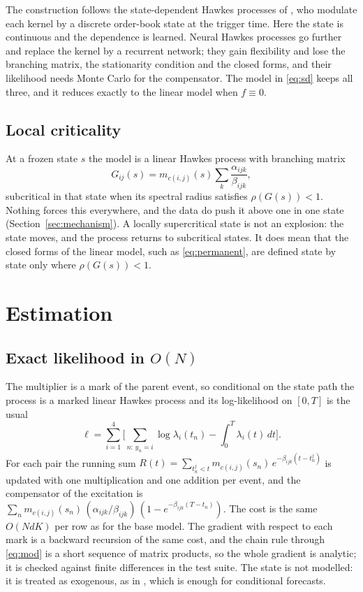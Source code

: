\documentclass[a4paper,11pt]{article}
\begin{document}
The construction follows the state-dependent Hawkes processes of \cite{morariupatrichi2022}, who modulate each kernel by a discrete order-book state at the trigger time. Here the state is continuous and the dependence is learned. Neural Hawkes processes \cite{du2016,mei2017} go further and replace the kernel by a recurrent network; they gain flexibility and lose the branching matrix, the stationarity condition and the closed forms, and their likelihood needs Monte Carlo for the compensator. The model in \eqref{eq:sd} keeps all three, and it reduces exactly to the linear model when $f \equiv 0$.

\subsection{Local criticality}

At a frozen state $s$ the model is a linear Hawkes process with branching matrix
\begin{equation}
G_{ij}(s) = m_{c(i,j)}(s) \sum_k \frac{\alpha_{ijk}}{\beta_{ijk}},
\end{equation}
subcritical in that state when its spectral radius satisfies $\rho(G(s)) < 1$. Nothing forces this everywhere, and the data do push it above one in one state (Section~\ref{sec:mechanism}). A locally supercritical state is not an explosion: the state moves, and the process returns to subcritical states. It does mean that the closed forms of the linear model, such as \eqref{eq:permanent}, are defined state by state only where $\rho(G(s)) < 1$.

\section{Estimation}

\subsection{Exact likelihood in $O(N)$}

The multiplier is a mark of the parent event, so conditional on the state path the process is a marked linear Hawkes process and its log-likelihood on $[0,T]$ is the usual
\begin{equation}
\ell = \sum_{i=1}^{4} \Big[ \sum_{n:\, y_n = i} \log \lambda_i(t_n) - \int_0^T \lambda_i(t)\,dt \Big].
\end{equation}
For each pair the running sum $R(t) = \sum_{t^j_n < t} m_{c(i,j)}(s_n)\, e^{-\beta_{ijk}(t - t^j_n)}$ is updated with one multiplication and one addition per event, and the compensator of the excitation is $\sum_n m_{c(i,j)}(s_n)\,(\alpha_{ijk}/\beta_{ijk})\,(1 - e^{-\beta_{ijk}(T - t_n)})$. The cost is the same $O(NdK)$ per row as for the base model. The gradient with respect to each mark is a backward recursion of the same cost, and the chain rule through \eqref{eq:mod} is a short sequence of matrix products, so the whole gradient is analytic; it is checked against finite differences in the test suite. The state is not modelled: it is treated as exogenous, as in \cite{morariupatrichi2022}, which is enough for conditional forecasts.
\end{document}
